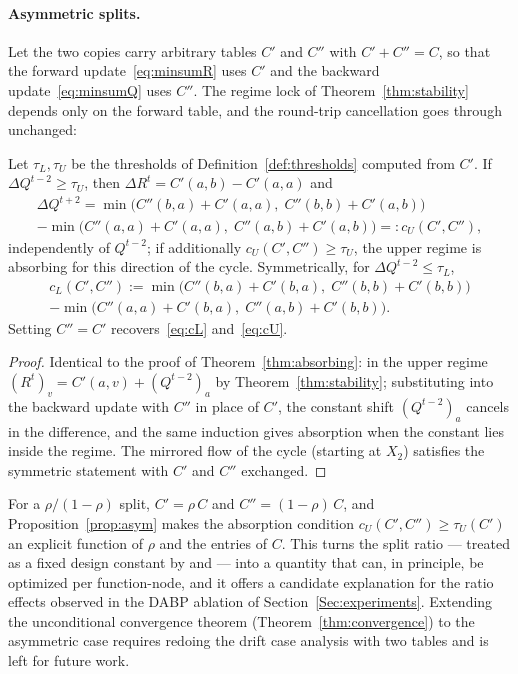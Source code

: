 \paragraph{Asymmetric splits.}
Let the two copies carry arbitrary tables $C'$ and $C''$ with $C' + C'' = C$, so that the forward update~\eqref{eq:minsumR} uses $C'$ and the backward update~\eqref{eq:minsumQ} uses $C''$. The regime lock of Theorem~\ref{thm:stability} depends only on the forward table, and the round-trip cancellation goes through unchanged:
\begin{proposition}\label{prop:asym}
Let $\tau_L, \tau_U$ be the thresholds of Definition~\ref{def:thresholds} computed from $C'$. If $\Delta Q^{t-2} \geq \tau_U$, then $\Delta R^t = C'(a,b) - C'(a,a)$ and
\begin{multline*}
    \Delta Q^{t+2} = \min\!\bigl(C''(b,a)+C'(a,a),\; C''(b,b)+C'(a,b)\bigr) \\
    - \min\!\bigl(C''(a,a)+C'(a,a),\; C''(a,b)+C'(a,b)\bigr) =: c_U(C',C''),
\end{multline*}
independently of $Q^{t-2}$; if additionally $c_U(C',C'') \geq \tau_U$, the upper regime is absorbing for this direction of the cycle. Symmetrically, for $\Delta Q^{t-2} \leq \tau_L$,
\begin{multline*}
    c_L(C',C'') := \min\!\bigl(C''(b,a)+C'(b,a),\; C''(b,b)+C'(b,b)\bigr) \\
    - \min\!\bigl(C''(a,a)+C'(b,a),\; C''(a,b)+C'(b,b)\bigr).
\end{multline*}
Setting $C'' = C'$ recovers~\eqref{eq:cL} and~\eqref{eq:cU}.
\end{proposition}
\begin{proof}
Identical to the proof of Theorem~\ref{thm:absorbing}: in the upper regime $(R^t)_v = C'(a,v) + (Q^{t-2})_a$ by Theorem~\ref{thm:stability}; substituting into the backward update with $C''$ in place of $C'$, the constant shift $(Q^{t-2})_a$ cancels in the difference, and the same induction gives absorption when the constant lies inside the regime. The mirrored flow of the cycle (starting at $X_2$) satisfies the symmetric statement with $C'$ and $C''$ exchanged.
\end{proof}
\begin{remark}\label{rem:ratio}
For a $\rho/(1{-}\rho)$ split, $C' = \rho\, C$ and $C'' = (1{-}\rho)\, C$, and Proposition~\ref{prop:asym} makes the absorption condition $c_U(C',C'') \geq \tau_U(C')$ an explicit function of $\rho$ and the entries of $C$. This turns the split ratio --- treated as a fixed design constant by \citet{CohenGZ20} and \citet{DengKL022} --- into a quantity that can, in principle, be optimized per function-node, and it offers a candidate explanation for the ratio effects observed in the DABP ablation of Section~\ref{Sec:experiments}. Extending the unconditional convergence theorem (Theorem~\ref{thm:convergence}) to the asymmetric case requires redoing the drift case analysis with two tables and is left for future work.
\end{remark}
